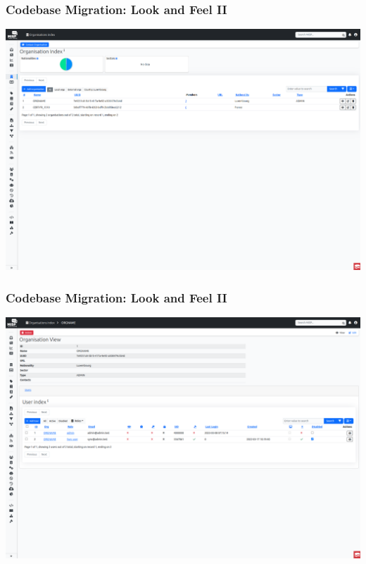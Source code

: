 \begin{frame}
    \frametitle{Codebase Migration: Look and Feel II}
    \begin{center}
        \includegraphics[width=1.0\linewidth]{pictures/organisation-index.png}
    \end{center}
\end{frame}

\begin{frame}
    \frametitle{Codebase Migration: Look and Feel II}
    \begin{center}
        \includegraphics[width=1.0\linewidth]{pictures/organisation-view.png}
    \end{center}
\end{frame}

